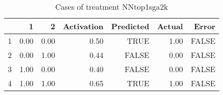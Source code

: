 \begin{table}[ht]
\centering
\begin{tabular}{rrrrrrr}
  \hline
 & 1 & 2 & Activation & Predicted & Actual & Error \\ 
  \hline
1 & 0.00 & 0.00 & 0.50 & TRUE & 1.00 & FALSE \\ 
  2 & 0.00 & 1.00 & 0.44 & FALSE & 0.00 & FALSE \\ 
  3 & 1.00 & 0.00 & 0.40 & FALSE & 0.00 & FALSE \\ 
  4 & 1.00 & 1.00 & 0.65 & TRUE & 1.00 & FALSE \\ 
   \hline
\end{tabular}
\caption{Cases of treatment NNtop1sga2k} 
\end{table}
